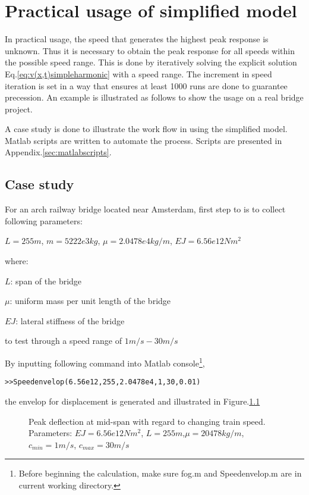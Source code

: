 
\chapter{Practical usage of simplified model}

In practical usage, the speed that generates the highest peak response is unknown. Thus it is necessary to obtain the peak response for all speeds within the possible speed range. This is done by iteratively solving the explicit solution Eq.\ref{eq:v(x,t)simpleharmonic} with a speed range. The increment in speed iteration is set in a way that ensures at least 1000 runs are done to guarantee precession. An example is illustrated as follows to show the usage on a real bridge project.

A case study is done to illustrate the work flow in using the simplified model. Matlab scripts are written to automate the process. Scripts are presented in Appendix.\ref{sec:matlabscripts}.

\section{Case study}
For an arch railway bridge located near Amsterdam, first step to is to collect following parameters:

$L = 255m$, $m = 5222e3kg$, $\mu = 2.0478e4 kg/m$, $EJ = 6.56e12Nm^2$

where:

$L$: span of the bridge

$\mu$: uniform mass per unit length of the bridge

$EJ$: lateral stiffness of the bridge

to test through a speed range of $1m/s - 30m/s$

By inputting following command into Matlab console\footnote{Before beginning the calculation, make sure fog.m and Speedenvelop.m are in current working directory. }, 

\texttt{>>Speedenvelop(6.56e12,255,2.0478e4,1,30,0.01)}


the envelop for displacement is generated and illustrated in Figure.\ref{fig:spedefEJ6560000000000L255min1max30mu20478.tikz}

\begin{figure}[h!]
\centering 
\setlength\figureheight{6cm} 
\setlength\figurewidth{6cm} 
 
\caption{Peak deflection at mid-span with regard to changing train speed. Parameters: $EJ = 6.56e12Nm^2$, $L= 255m$,$\mu = 20478 kg/m$, $c_{min}=1m/s$, $c_{max} = 30m/s$} 
\label{fig:spedefEJ6560000000000L255min1max30mu20478.tikz} 
\end{figure}

